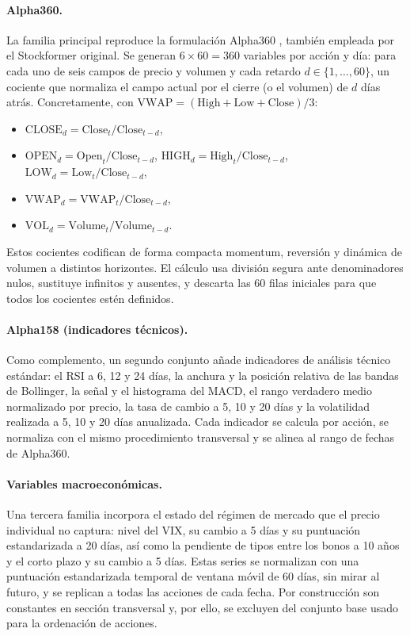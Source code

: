 \paragraph{Alpha360.} La familia principal reproduce la formulación Alpha360
\autocite{yang2020qlib}, también empleada por el Stockformer original. Se generan
\(6 \times 60 = 360\) variables por acción y día: para cada uno de seis campos de precio y
volumen y cada retardo \(d \in \{1,\dots,60\}\), un cociente que normaliza el campo actual
por el cierre (o el volumen) de \(d\) días atrás. Concretamente, con
\(\text{VWAP}=(\text{High}+\text{Low}+\text{Close})/3\):
\begin{itemize}
  \item \(\text{CLOSE}_d = \text{Close}_t / \text{Close}_{t-d}\),
  \item \(\text{OPEN}_d = \text{Open}_t / \text{Close}_{t-d}\),
        \(\text{HIGH}_d = \text{High}_t / \text{Close}_{t-d}\),
        \(\text{LOW}_d = \text{Low}_t / \text{Close}_{t-d}\),
  \item \(\text{VWAP}_d = \text{VWAP}_t / \text{Close}_{t-d}\),
  \item \(\text{VOL}_d = \text{Volume}_t / \text{Volume}_{t-d}\).
\end{itemize}
Estos cocientes codifican de forma compacta momentum, reversión y dinámica de volumen a
distintos horizontes. El cálculo usa división segura ante denominadores nulos, sustituye
infinitos y ausentes, y descarta las 60 filas iniciales para que todos los cocientes estén
definidos.

\paragraph{Alpha158 (indicadores técnicos).} Como complemento, un segundo conjunto añade
indicadores de análisis técnico estándar: el RSI a 6, 12 y 24 días, la anchura y la
posición relativa de las bandas de Bollinger, la señal y el histograma del MACD, el rango
verdadero medio normalizado por precio, la tasa de cambio a 5, 10 y 20 días y la
volatilidad realizada a 5, 10 y 20 días anualizada. Cada indicador se calcula por acción,
se normaliza con el mismo procedimiento transversal y se alinea al rango de fechas de
Alpha360.

\paragraph{Variables macroeconómicas.} Una tercera familia incorpora el estado del régimen
de mercado que el precio individual no captura: nivel del VIX, su cambio a 5 días y su
puntuación estandarizada a 20 días, así como la pendiente de tipos entre los bonos a 10
años y el corto plazo y su cambio a 5 días. Estas series se normalizan con una puntuación
estandarizada temporal de ventana móvil de 60 días, sin mirar al futuro, y se replican a
todas las acciones de cada fecha. Por construcción son constantes en sección transversal
y, por ello, se excluyen del conjunto base usado para la ordenación de acciones.

